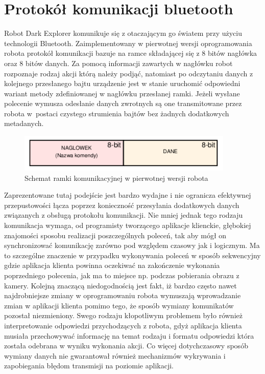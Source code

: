 \section{Protokół komunikacji bluetooth}
\label{sec:bt-comm}
Robot Dark Explorer komunikuje się z otaczającym go światem przy użyciu
technologii Bluetooth. Zaimplementowany w pierwotnej wersji oprogramowania
robota protokół komunikacji bazuje na ramce składającej się z 8 bitów nagłówka oraz 8 bitów
danych. Za pomocą informacji zawartych w nagłówku robot rozpoznaje
rodzaj akcji którą należy podjąć, natomiast po odczytaniu danych z kolejnego
przesłanego bajtu urządzenie jest w stanie uruchomić odpowiedni wariant metody
zdefiniowanej w nagłówku przesłanej ramki. Jeżeli wysłane polecenie wymusza
odesłanie danych zwrotnych są one transmitowane przez robota w~postaci czystego
strumienia bajtów bez żadnych dodatkowych metadanych.

\begin{figure}[h!]
 \centering
 \includegraphics[height=18mm]{../images/ch05/old_req_schema.png}
 \caption{Schemat ramki komunikacyjnej w pierwotnej wersji robota}
 \label{fig:OldCommFrame}
\end{figure}

Zaprezentowane tutaj podejście jest bardzo wydajne i nie ogranicza efektywnej
przepustowości łącza poprzez konieczność przesyłania dodatkowych danych
związanych z obsługą protokołu komunikacji. Nie mniej jednak tego rodzaju
komunikacja wymaga, od programisty tworzącego aplikacje klienckie, głębokiej
znajomości sposobu realizacji poszczególnych poleceń, tak aby mógł on
synchronizować komunikację zarówno pod względem czasowy jak i logicznym. Ma to
szczególne znaczenie w przypadku wykonywania poleceń w sposób sekwencyjny gdzie
aplikacja klienta powinna oczekiwać na zakończenie wykonania poprzedniego
polecenia, jak ma to miejsce np. podczas pobierania obrazu z kamery. Kolejną
znaczącą niedogodnością jest fakt, iż bardzo często nawet najdrobniejsze zmiany w
oprogramowaniu robota wymuszają wprowadzanie zmian w aplikacji klienta pomimo
tego, że sposób wymiany komunikatów pozostał niezmieniony. Swego rodzaju
kłopotliwym problemem było również interpretowanie odpowiedzi przychodzących z
robota, gdyż aplikacja klienta musiała przechowywać informację na temat rodzaju i
formatu odpowiedzi która została odebrana w wyniku wykonania akcji. Co więcej
dotychczasowy sposób wymiany danych nie gwarantował również mechanizmów
wykrywania i zapobiegania błędom transmisji na poziomie aplikacji.

